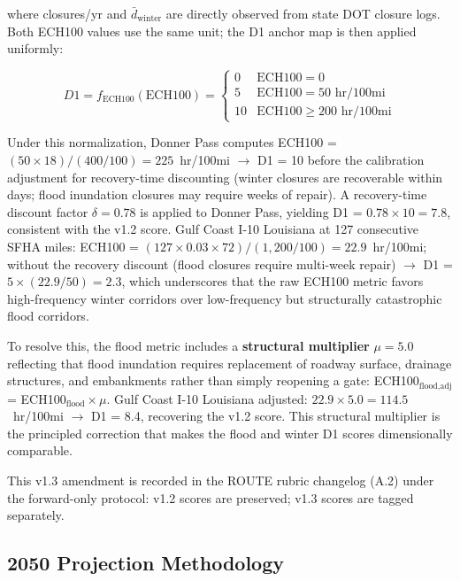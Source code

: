 where closures/yr and $\bar{d}_{\text{winter}}$ are directly observed from
state DOT closure logs. Both ECH100 values use the same unit; the D1 anchor
map is then applied uniformly:

\begin{equation}
D1 = f_{\text{ECH100}}(\text{ECH100}) = \begin{cases}
0 & \text{ECH100} = 0 \\
5 & \text{ECH100} = 50 \text{ hr/100mi} \\
10 & \text{ECH100} \geq 200 \text{ hr/100mi}
\end{cases}
\end{equation}

Under this normalization, Donner Pass computes ECH100 = $(50 \times 18) / (400/100) = 225$~hr/100mi
$\to$ D1 = 10 before the calibration adjustment for recovery-time discounting
(winter closures are recoverable within days; flood inundation closures may
require weeks of repair). A recovery-time discount factor $\delta = 0.78$ is
applied to Donner Pass, yielding D1 = $0.78 \times 10 = 7.8$, consistent with
the v1.2 score. Gulf Coast I-10 Louisiana at 127 consecutive SFHA miles:
ECH100 = $(127 \times 0.03 \times 72) / (1{,}200/100) = 22.9$~hr/100mi;
without the recovery discount (flood closures require multi-week repair) $\to$
D1 = $5 \times (22.9/50) = 2.3$, which underscores that the raw ECH100 metric
favors high-frequency winter corridors over low-frequency but structurally
catastrophic flood corridors.

To resolve this, the flood metric includes a \textbf{structural multiplier}
$\mu = 5.0$ reflecting that flood inundation requires replacement of roadway
surface, drainage structures, and embankments rather than simply reopening a
gate: ECH100$_{\text{flood,adj}}$ = ECH100$_{\text{flood}} \times \mu$. Gulf
Coast I-10 Louisiana adjusted: $22.9 \times 5.0 = 114.5$~hr/100mi $\to$ D1 = 8.4, recovering the v1.2 score. This structural multiplier is the principled correction that makes the flood and winter D1 scores dimensionally comparable.

This v1.3 amendment is recorded in the ROUTE rubric changelog (A.2) under the forward-only protocol: v1.2 scores are preserved; v1.3 scores are tagged separately.

\subsection{2050 Projection Methodology}
\label{sec:projections}

